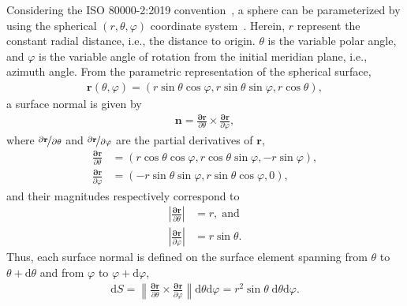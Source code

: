 Considering the ISO 80000-2:2019 convention~\cite{ISO2019Standard}, a sphere can be parameterized by using the spherical $(r, \theta, \varphi)$ coordinate system~\cite{Weisstein2023Spherical}.
Herein, $r$ represent the constant radial distance, i.e., the distance to origin. $\theta$ is the variable polar angle, and $\varphi$ is the variable angle of rotation from the initial meridian plane, i.e., azimuth angle.
From the parametric representation of the spherical surface,
\begin{align}
    \mathbf{r}(\theta, \varphi) = \left( r \sin\theta \cos\varphi, r \sin\theta \sin \varphi, r \cos\theta \right),
\end{align}
a surface normal is given by
\begin{align}
    \mathbf{n} = \frac{\mathbf{\partial r}}{\partial \theta} \times \frac{\mathbf{\partial r}}{\partial \varphi},
\end{align}
where $\nicefrac{\mathbf{\partial r}}{\partial \theta}$ and $\nicefrac{\mathbf{\partial r}}{\partial \varphi}$ are the partial derivatives of $\mathbf{r}$,
\begin{align}
    \frac{\mathbf{\partial r}}{\partial \theta} &= \left( r \cos\theta \cos\varphi, r \cos\theta \sin\varphi, -r \sin\varphi \right), \\
    \frac{\mathbf{\partial r}}{\partial \varphi} &= \left( -r \sin\theta \sin\varphi, r \sin\theta \cos\varphi, 0 \right),
\end{align}
and their magnitudes respectively correspond to
\begin{align}
    \left| \frac{\mathbf{\partial r}}{\partial \theta} \right| &= r,  \; \text{and}\\
    \left| \frac{\mathbf{\partial r}}{\partial \varphi} \right| &= r \sin\theta.
\end{align}
Thus, each surface normal is defined on the surface element spanning from $\theta$ to $\theta + \mathrm{d}\theta$ and from $\varphi$ to $\varphi + \mathrm{d}\varphi$,
\begin{align}
    \mathrm{d}S = \left\| \frac{\mathbf{\partial r}}{\partial \theta} \times \frac{\mathbf{\partial r}}{\partial \varphi} \right\| \mathrm{d}\theta \mathrm{d}\varphi = r^2 \sin\theta \; \mathrm{d}\theta \mathrm{d}\varphi.
\end{align}

